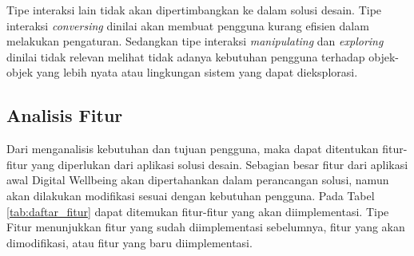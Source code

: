 Tipe interaksi lain tidak akan dipertimbangkan ke dalam solusi desain. Tipe interaksi \textit{conversing} dinilai akan membuat pengguna kurang efisien dalam melakukan pengaturan. Sedangkan tipe interaksi \textit{manipulating} dan \textit{exploring} dinilai tidak relevan melihat tidak adanya kebutuhan pengguna terhadap objek-objek yang lebih nyata atau lingkungan sistem yang dapat dieksplorasi.

\subsection{Analisis Fitur}
\label{subsec:analisis_fitur}

Dari menganalisis kebutuhan dan tujuan pengguna, maka dapat ditentukan fitur-fitur yang diperlukan dari aplikasi solusi desain. Sebagian besar fitur dari aplikasi awal Digital Wellbeing akan dipertahankan dalam perancangan solusi, namun akan dilakukan modifikasi sesuai dengan kebutuhan pengguna. Pada Tabel \ref{tab:daftar_fitur} dapat ditemukan fitur-fitur yang akan diimplementasi. Tipe Fitur menunjukkan fitur yang sudah diimplementasi sebelumnya, fitur yang akan dimodifikasi, atau fitur yang baru diimplementasi.

